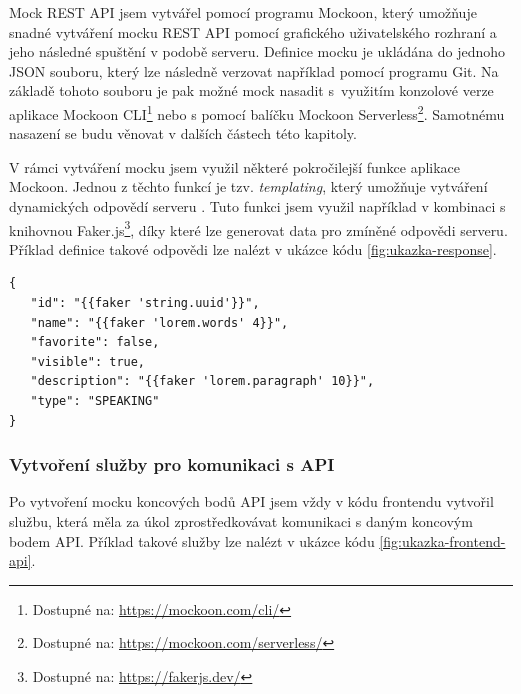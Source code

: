 Mock REST API jsem vytvářel pomocí programu Mockoon, který umožňuje snadné vytváření mocku REST API pomocí grafického uživatelského rozhraní a jeho následné spuštění v podobě serveru. Definice mocku je ukládána do jednoho JSON souboru, který lze následně verzovat například pomocí programu Git. Na základě tohoto souboru je pak možné mock nasadit s~využitím konzolové verze aplikace Mockoon CLI\footnote{Dostupné na: \href{https://mockoon.com/cli/}{https://mockoon.com/cli/}} nebo s pomocí balíčku Mockoon Serverless\footnote{Dostupné na: \href{https://mockoon.com/serverless/}{https://mockoon.com/serverless/}}. Samotnému nasazení se budu věnovat v dalších částech této kapitoly.

V rámci vytváření mocku jsem využil některé pokročilejší funkce aplikace Mockoon. Jednou z těchto funkcí je tzv. \textit{templating}, který umožňuje vytváření dynamických odpovědí serveru \cite{MockoonTemplating}. Tuto funkci jsem využil například v kombinaci s knihovnou Faker.js\footnote{Dostupné na: \href{https://fakerjs.dev/}{https://fakerjs.dev/}}, díky které lze generovat data pro zmíněné odpovědi serveru. Příklad definice takové odpovědi lze nalézt v ukázce kódu \ref{fig:ukazka-response}.

\begin{listing}[ht]
    \begin{verbatim}
{
   "id": "{{faker 'string.uuid'}}",
   "name": "{{faker 'lorem.words' 4}}",
   "favorite": false,
   "visible": true,
   "description": "{{faker 'lorem.paragraph' 10}}",
   "type": "SPEAKING"
}
    \end{verbatim}
    \caption{Definice odpovědi koncového bodu pro získání dané lekce}
    \label{fig:ukazka-response}
\end{listing}

\subsubsection{Vytvoření služby pro komunikaci s API}

Po vytvoření mocku koncových bodů API jsem vždy v kódu frontendu vytvořil službu, která měla za úkol zprostředkovávat komunikaci s daným koncovým bodem API. Příklad takové služby lze nalézt v ukázce kódu \ref{fig:ukazka-frontend-api}.

